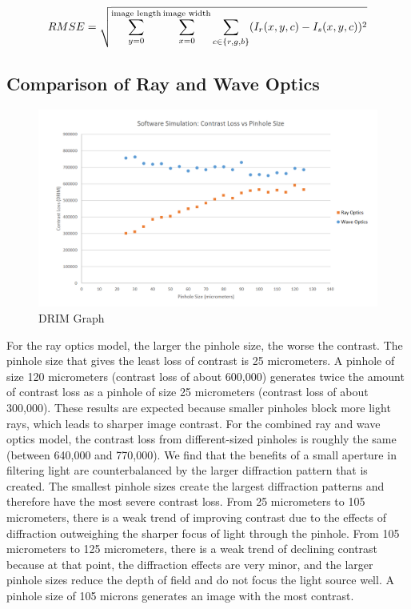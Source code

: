 $$RMSE = \sqrt{ \sum_{y = 0}^{\textnormal{image length}} \sum_{x = 0}^{\textnormal{image width}} \sum_{c \in \{r,g,b\}} (I_r (x,y,c) - I_s(x,y,c))^2}$$

\subsection{Comparison of Ray and Wave Optics}

\begin{figure}[ht]
  \centering
  \includegraphics[width=7.0in]{chapters/chapter8/images/Contrast_Loss.png}
  \caption{DRIM Graph}
  \label{fig:ferrari}
\end{figure}

For the ray optics model, the larger the pinhole size, the worse the contrast. The pinhole size that gives the least loss of contrast is 25 micrometers. A pinhole of size 120 micrometers (contrast loss of about 600,000) generates twice the amount of contrast loss as a pinhole of size 25 micrometers (contrast loss of about 300,000). These results are expected because smaller pinholes block more light rays, which leads to sharper image contrast. For the combined ray and wave optics model, the contrast loss from different-sized pinholes is roughly the same (between 640,000 and 770,000). We find that the benefits of a small aperture in filtering light are counterbalanced by the larger diffraction pattern that is created. The smallest pinhole sizes create the largest diffraction patterns and therefore have the most severe contrast loss. From 25 micrometers to 105 micrometers, there is a weak trend of improving contrast due to the effects of diffraction outweighing the sharper focus of light through the pinhole. From 105 micrometers to 125 micrometers, there is a weak trend of declining contrast because at that point, the diffraction effects are very minor, and the larger pinhole sizes reduce the depth of field and do not focus the light source well. A pinhole size of 105 microns generates an image with the most contrast.

